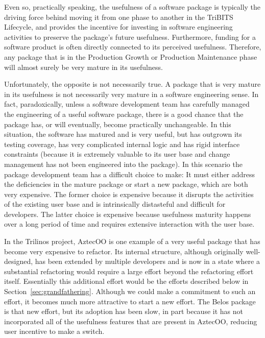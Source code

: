 \documentclass[11pt]{SANDreport}
\begin{document}
Even so, practically speaking, the usefulness of a software package is
typically the driving force behind moving it from one phase to another
in the TriBITS Lifecycle, and provides the incentive for investing in
software engineering activities to preserve the package's future
usefulness.  Furthermore, funding for a software product is often
directly connected to its perceived usefulness.  Therefore, any
package that is in the Production Growth or Production Maintenance
phase will almost surely be very mature in its usefulness.

Unfortunately, the opposite is not necessarily true.  A package that
is very mature in its usefulness is not necessarily very mature in a
software engineering sense.  In fact, paradoxically, unless a software
development team has carefully managed the engineering of a useful
software package, there is a good chance that the package has, or will
eventually, become practically unchangeable.  In this situation, the
software has matured and is very useful, but has outgrown its testing
coverage, has very complicated internal logic and has rigid interface
constraints (because it is extremely valuable to its user base and
change management has not been engineered into the package).  In this
scenario the package development team has a difficult choice to make:
It must either address the deficiencies in the mature package or start
a new package, which are both very expensive.  The former choice is
expensive because it disrupts the activities of the existing user base
and is intrinsically distasteful and difficult for developers.  The
latter choice is expensive because usefulness maturity happens over a
long period of time and requires extensive interaction with the user
base.

In the Trilinos project, AztecOO is one example of a very useful
package that has become very expensive to refactor.  Its internal
structure, although originally well-designed, has been extended by
multiple developers and is now in a state where a substantial
refactoring would require a large effort beyond the refactoring effort
itself.  Essentially this additional effort would be the efforts
described below in Section~\ref{sec:grandfathering}.  Although we
could make a commitment to such an effort, it becomes much more
attractive to start a new effort.  The Belos package is that new
effort, but its adoption has been slow, in part because it has not
incorporated all of the usefulness features that are present in
AztecOO, reducing user incentive to make a switch.
\end{document}
